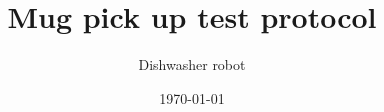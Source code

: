 \documentclass{article}
\begin{document}

\author{Dishwasher robot} %
\date{\today}

\title{Mug pick up test protocol}

\begin{Form}

\maketitle



\newpage



\end{Form}
\end{document}
